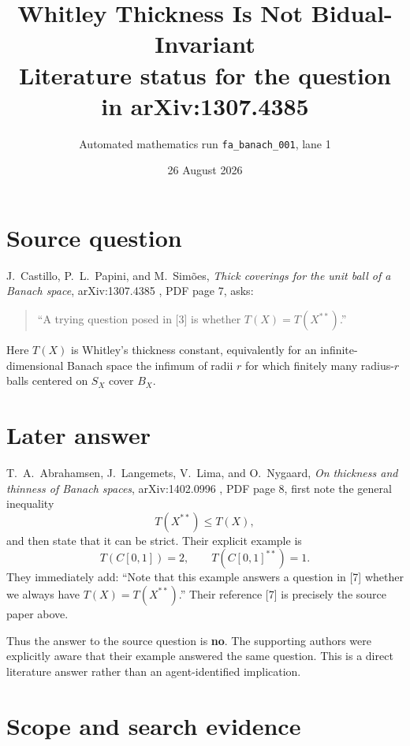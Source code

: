 \documentclass[11pt]{article}
\title{Whitley Thickness Is Not Bidual-Invariant\\
\large Literature status for the question in arXiv:1307.4385}
\author{Automated mathematics run \texttt{fa\_banach\_001}, lane 1}
\date{26 August 2026}
\begin{document}
\maketitle

\begin{center}
\end{center}

\section*{Source question}

J.~Castillo, P.~L.~Papini, and M.~Sim\~oes,
\emph{Thick coverings for the unit ball of a Banach space},
arXiv:1307.4385 \cite{CPS}, PDF page 7, asks:
\begin{quote}
``A trying question posed in [3] is whether $T(X)=T(X^{**})$.''
\end{quote}
Here $T(X)$ is Whitley's thickness constant, equivalently for an
infinite-dimensional Banach space the infimum of radii $r$ for which finitely
many radius-$r$ balls centered on $S_X$ cover $B_X$.

\section*{Later answer}

T.~A.~Abrahamsen, J.~Langemets, V.~Lima, and O.~Nygaard,
\emph{On thickness and thinness of Banach spaces}, arXiv:1402.0996
\cite{ALLN}, PDF page 8, first note the general inequality
\[
 T(X^{**})\leq T(X),
\]
and then state that it can be strict.  Their explicit example is
\[
 T(C[0,1])=2,
 \qquad
 T(C[0,1]^{**})=1.
\]
They immediately add: ``Note that this example answers a question in [7]
whether we always have $T(X)=T(X^{**})$.''  Their reference [7] is precisely
the source paper above.

Thus the answer to the source question is \textbf{no}.  The supporting authors
were explicitly aware that their example answered the same question.  This is
a direct literature answer rather than an agent-identified implication.

\section*{Scope and search evidence}
\end{document}
